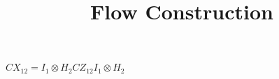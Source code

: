 \documentclass[10pts, a4paper]{article}
\title{ \begin{large}
\textbf{Flow Construction}
\end{large} 
}
\date{}
\begin{document}
\thispagestyle{empty}
$CX_{12}=I_1\otimes H_2CZ_{12}I_1\otimes H_2$
\end{document}
